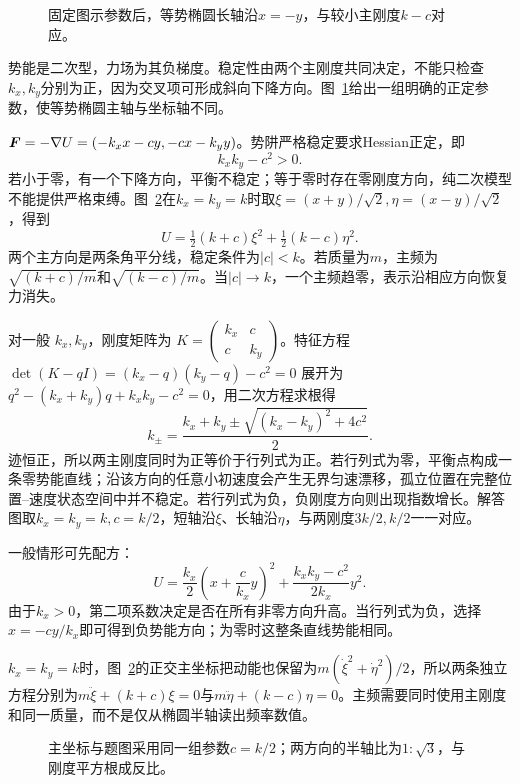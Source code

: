 \begin{figure}[H]\centering
{}
\caption{固定图示参数后，等势椭圆长轴沿$x=-y$，与较小主刚度$k-c$对应。}\label{fig:c3-h7-q}
\end{figure}
\begin{solution}
势能是二次型，力场为其负梯度。稳定性由两个主刚度共同决定，不能只检查$k_x,k_y$分别为正，因为交叉项可形成斜向下降方向。图~\ref{fig:c3-h7-q}给出一组明确的正定参数，使等势椭圆主轴与坐标轴不同。


$\bm{F}=-\nabla U=(-k_xx-cy,-cx-k_yy)$。势阱严格稳定要求Hessian正定，即
\[\boxed{k_xk_y-c^2>0}.
\]
若小于零，有一个下降方向，平衡不稳定；等于零时存在零刚度方向，纯二次模型不能提供严格束缚。图~\ref{fig:c3-h7-s}在$k_x=k_y=k$时取$\xi=(x+y)/\sqrt2,\eta=(x-y)/\sqrt2$，得到
\[U=\tfrac12(k+c)\xi^2+\tfrac12(k-c)\eta^2.\]
两个主方向是两条角平分线，稳定条件为$|c|<k$。若质量为$m$，主频为$\sqrt{(k+c)/m}$和$\sqrt{(k-c)/m}$。当$|c|\to k$，一个主频趋零，表示沿相应方向恢复力消失。


对一般 $k_x,k_y$，刚度矩阵为 $K=\begin{pmatrix}k_x&c\\c&k_y\end{pmatrix}$。特征方程 $\det(K-qI)=(k_x-q)(k_y-q)-c^2=0$ 展开为 $q^2-(k_x+k_y)q+k_xk_y-c^2=0$，用二次方程求根得
\[k_\pm=\frac{k_x+k_y\pm\sqrt{(k_x-k_y)^2+4c^2}}2.\]
迹恒正，所以两主刚度同时为正等价于行列式为正。若行列式为零，平衡点构成一条零势能直线；沿该方向的任意小初速度会产生无界匀速漂移，孤立位置在完整位置--速度状态空间中并不稳定。若行列式为负，负刚度方向则出现指数增长。解答图取$k_x=k_y=k,c=k/2$，短轴沿$\xi$、长轴沿$\eta$，与两刚度$3k/2,k/2$一一对应。

一般情形可先配方：
\[U=\frac{k_x}{2}\left(x+\frac c{k_x}y\right)^2
+\frac{k_xk_y-c^2}{2k_x}y^2.\]
由于$k_x>0$，第二项系数决定是否在所有非零方向升高。当行列式为负，选择$x=-cy/k_x$即可得到负势能方向；为零时这整条直线势能相同。

$k_x=k_y=k$时，图~\ref{fig:c3-h7-s}的正交主坐标把动能也保留为$m(\dot\xi^2+\dot\eta^2)/2$，所以两条独立方程分别为$m\ddot\xi+(k+c)\xi=0$与$m\ddot\eta+(k-c)\eta=0$。主频需要同时使用主刚度和同一质量，而不是仅从椭圆半轴读出频率数值。

\begin{figure}[H]\centering
{}
\caption{主坐标与题图采用同一组参数$c=k/2$；两方向的半轴比为$1:\sqrt3$，与刚度平方根成反比。}\label{fig:c3-h7-s}
\end{figure}
\end{solution}

